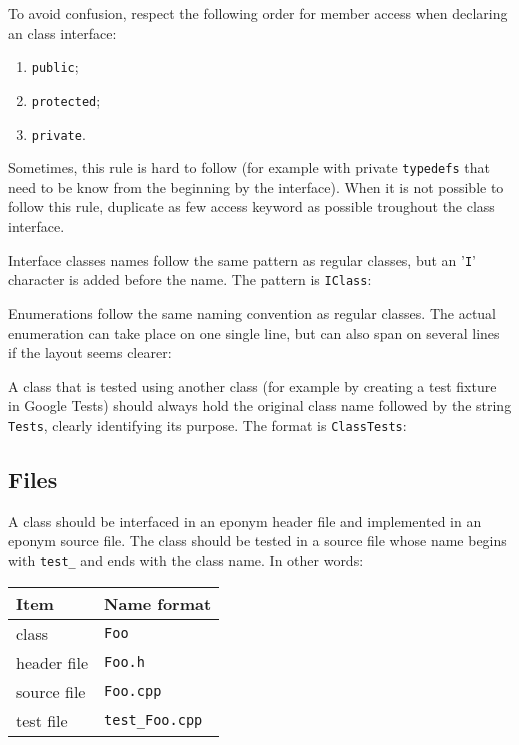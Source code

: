   
To avoid confusion, respect the following order for member access when 
declaring an class interface:
\begin{enumerate}
 \item \texttt{public};
 \item \texttt{protected};
 \item \texttt{private}.
\end{enumerate}
Sometimes, this rule is hard to follow (for example with private 
\texttt{typedefs} that need to be know from the beginning by the interface). 
When it is not possible to follow this rule, duplicate as few access keyword as 
possible troughout the class interface.

  
Interface classes names follow the same pattern as regular classes, but an 
'\texttt{I}' character is added before the name. The pattern is 
\texttt{IClass}: 

  
Enumerations follow the same naming convention as regular classes. The actual 
enumeration can take place on one single line, but can also span on several 
lines if the layout seems clearer:

  
A class that is tested using another class (for example by creating a test 
fixture in Google Tests) should always hold the original class name followed by 
the string \texttt{Tests}, clearly identifying its purpose. The format is 
\texttt{ClassTests}:

  
\subsection{Files}

A class should be interfaced in an eponym header file and implemented in an 
eponym source file. The class should be tested in a source file whose 
name begins with \texttt{test\_} and ends with the class name. In other words:

\begin{center}
  \begin{tabular}{|l|l|}
    \hline
    \textbf{Item}  & \textbf{Name format}  \\
    \hline\hline
    class          & \texttt{Foo}          \\
    header file    & \texttt{Foo.h}        \\
    source file    & \texttt{Foo.cpp}      \\
    test file      & \texttt{test\_Foo.cpp} \\
    \hline
  \end{tabular} 
\end{center}

